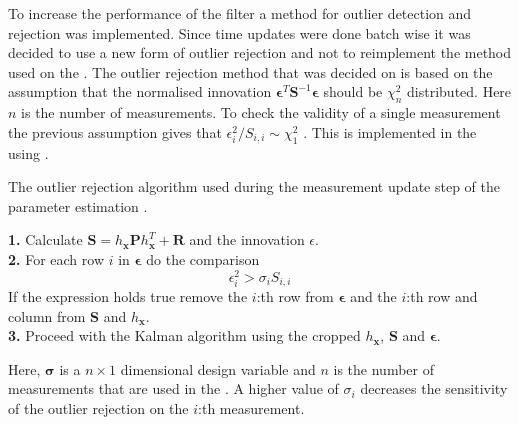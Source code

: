 To increase the performance of the filter a method for outlier detection and rejection was implemented. Since time updates were done batch wise it was decided to use a new form of outlier rejection and not to reimplement the method used on the \abbrROV. The outlier rejection method that was decided on is based on the assumption that the normalised innovation $\boldsymbol{\epsilon}^T \boldsymbol{S}^{-1} \boldsymbol{\epsilon}$ should be $\chi_{n}^{2}$ distributed. Here $n$ is the number of measurements. To check the validity of a single measurement the previous assumption gives that $\epsilon_i^{2}/S_{i,i} \sim \chi_{1}^{2}$ \citep{sensorfusion}. This is implemented in the \abbrEKF using .
\begin{algorithm}[h]
\caption{The outlier rejection algorithm used during the measurement update step of the parameter estimation \abbrEKF.}\label{alg:outlier}
\textbf{1.} Calculate $\boldsymbol{S}=h_{\boldsymbol{x}} \boldsymbol{P} h_{\boldsymbol{x}}^T + \boldsymbol{R}$ and the innovation $\epsilon$.
\\
\textbf{2.} For each row $i$ in $\boldsymbol{\epsilon}$ do the comparison
\begin{equation}
\epsilon_{i}^{2} > \sigma_i S_{i,i}
\end{equation}
If the expression holds true remove the $i$:th row from $\boldsymbol{\epsilon}$ and the $i$:th row and column from $\boldsymbol{S}$ and $h_{\boldsymbol{x}}$.\\
\textbf{3.} Proceed with the Kalman algorithm using the cropped $h_{\boldsymbol{x}}$, $\boldsymbol{S}$ and $\boldsymbol{\epsilon}$.

Here, $\boldsymbol{\sigma}$ is a $n\times1$ dimensional design variable and $n$ is the number of measurements that are used in the \abbrEKF. A higher value of $\sigma_i$ decreases the sensitivity of the outlier rejection on the $i$:th measurement.
\end{algorithm}


